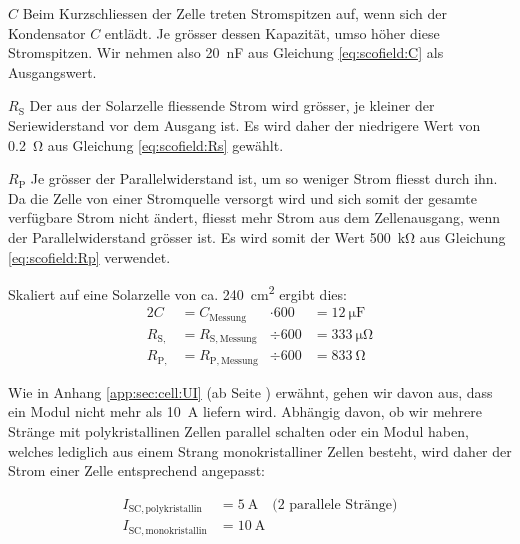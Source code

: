 \begin{symbols}
    \firmlist
    \item[$C$]
        Beim Kurzschliessen der  Zelle treten Stromspitzen auf,  wenn sich der
        Kondensator  $C$  entl\"adt. Je  gr\"osser  dessen  Kapazit\"at,  umso
        h\"oher diese Stromspitzen.  Wir  nehmen also \SI{20}{\nano\farad} aus
        Gleichung \ref{eq:scofield:C} als Ausgangswert.
    \item[$R_{\mathrm{S}}$]
        Der aus der Solarzelle fliessende Strom wird gr\"osser, je kleiner der
        Seriewiderstand vor dem Ausgang ist. Es wird daher der niedrigere Wert
        von \SI{0.2}{\ohm} aus Gleichung \ref{eq:scofield:Rs} gew\"ahlt.
    \item[$R_{\mathrm{P}}$]
        Je gr\"osser der  Parallelwiderstand ist, um so  weniger Strom fliesst
        durch ihn. Da die  Zelle von einer Stromquelle versorgt  wird und sich
        somit  der gesamte  verf\"ugbare  Strom nicht  \"andert, fliesst  mehr
        Strom  aus dem  Zellenausgang, wenn  der Parallelwiderstand  gr\"osser
        ist. Es  wird   somit  der  Wert  \SI{500}{\kilo\ohm}   aus  Gleichung
        \ref{eq:scofield:Rp} verwendet.
\end{symbols}

Skaliert auf eine Solarzelle von ca. \SI{240}{\centi\meter\squared} ergibt dies:
\begin{alignat}{2}
    C               &= C_{\mathrm{Messung}}    &\cdot 600 &= \SI{12}{\micro\farad} \\
    R_{\mathrm{S,}} &= R_{\mathrm{S, Messung}} &\div  600 &= \SI{333}{\micro\ohm}    \\
    R_{\mathrm{P,}} &= R_{\mathrm{P, Messung}} &\div  600 &= \SI{833}{\ohm}
\end{alignat}

Wie  in  Anhang  \ref{app:sec:cell:UI}  (ab  Seite  \pageref{app:sec:cell:UI})
erw\"ahnt, gehen wir davon aus, dass ein Modul nicht mehr als \SI{10}{\ampere}
liefern wird. Abh\"angig davon, ob  wir mehrere Str\"ange mit polykristallinen
Zellen parallel  schalten oder  ein Modul haben,  welches lediglich  aus einem
Strang  monokristalliner Zellen  besteht,  wird daher  der  Strom einer  Zelle
entsprechend angepasst:

\begin{align}
    I_{\mathrm{SC, polykristallin}} & = \SI{5}{\ampere} \quad \text{(2 parallele Str\"ange)} \\
    I_{\mathrm{SC, monokristallin}} & = \SI{10}{\ampere}
\end{align}


